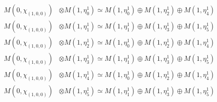 \begin{align*}
M(0,\chi_{(1,0,0)}) &\otimes M(1,\eta^{1}_{0}) \simeq M(1,\eta^{1}_{0}) \oplus M(1,\eta^{1}_{2}) \oplus M(1,\eta^{1}_{4}) \\
M(0,\chi_{(1,0,0)}) &\otimes M(1,\eta^{1}_{1}) \simeq M(1,\eta^{1}_{1}) \oplus M(1,\eta^{1}_{3}) \oplus M(1,\eta^{1}_{5}) \\
M(0,\chi_{(1,0,0)}) &\otimes M(1,\eta^{1}_{2}) \simeq M(1,\eta^{1}_{0}) \oplus M(1,\eta^{1}_{2}) \oplus M(1,\eta^{1}_{4}) \\
M(0,\chi_{(1,0,0)}) &\otimes M(1,\eta^{1}_{3}) \simeq M(1,\eta^{1}_{1}) \oplus M(1,\eta^{1}_{3}) \oplus M(1,\eta^{1}_{5}) \\
M(0,\chi_{(1,0,0)}) &\otimes M(1,\eta^{1}_{4}) \simeq M(1,\eta^{1}_{0}) \oplus M(1,\eta^{1}_{2}) \oplus M(1,\eta^{1}_{4}) \\
M(0,\chi_{(1,0,0)}) &\otimes M(1,\eta^{1}_{5}) \simeq M(1,\eta^{1}_{1}) \oplus M(1,\eta^{1}_{3}) \oplus M(1,\eta^{1}_{5}) \\
\end{align*}

